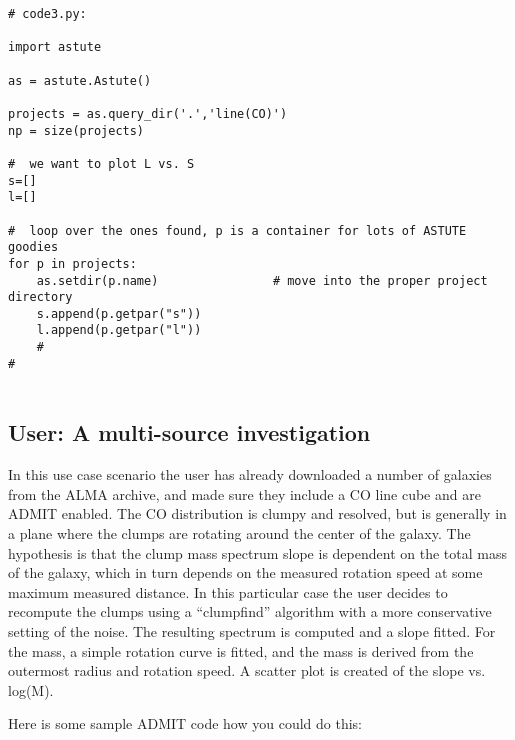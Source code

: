 \documentclass[preprint]{aastex} %
\begin{document}
\footnotesize
\begin{verbatim}
# code3.py:

import astute

as = astute.Astute()

projects = as.query_dir('.','line(CO)')
np = size(projects)

#  we want to plot L vs. S
s=[]
l=[]

#  loop over the ones found, p is a container for lots of ASTUTE goodies
for p in projects:
    as.setdir(p.name)                # move into the proper project directory
    s.append(p.getpar("s"))
    l.append(p.getpar("l"))
    #
#


\end{verbatim}
\normalsize

\subsection{User: A multi-source investigation}

In this use case scenario the user has already downloaded a number
of galaxies from the ALMA archive, and made sure they include a CO
line cube and are ADMIT enabled.
The CO distribution is clumpy and resolved, but is
generally in a plane where the clumps are rotating around the center
of the galaxy. The hypothesis is that the clump mass spectrum slope is
dependent on the total mass of the galaxy, which in turn depends on
the measured rotation speed at some maximum measured distance. In this
particular case the user decides to recompute the clumps using a ``clumpfind''
algorithm with a more conservative setting of the noise. The resulting
spectrum is computed and a slope fitted.  For the mass, a simple
rotation curve is fitted, and the mass is derived from the
outermost radius and rotation speed.  A scatter plot is created of
the slope vs. log(M).

Here is some sample ADMIT code how you could do this:

\newpage
\end{document}
